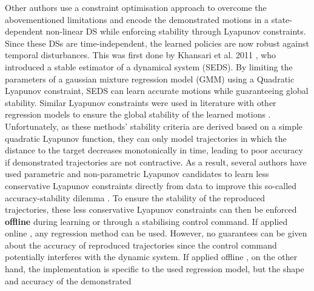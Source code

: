Other authors use a constraint optimisation approach to overcome the abovementioned limitations and encode the demonstrated motions in a state-dependent non-linear DS while enforcing stability through Lyapunov constraints. Since these DSs are time-independent, the learned policies are now robust against temporal disturbances. This was first done by Khansari et al. 2011 \cite{khansari-zadehLearningStableNonlinear2011}, who introduced a stable estimator of a dynamical system (SEDS). By limiting the parameters of a gaussian mixture regression model (GMM) using a Quadratic Lyapunov constraint, SEDS can learn accurate motions while guaranteeing global stability. Similar Lyapunov constraints were used in literature with other regression models to ensure the global stability of the learned motions \cite{lemmeNeurallyImprintedStable2013,huNeuralLearningStable2015,umlauftLearningStableStochastic2017,umlauftLearningStableGaussian2017,medinaLearningStableTask2017,duanFastStableLearning2019,xuRobotTrajectoryTracking2019,umlauftLearningStochasticallyStable2020,ledererGaussianProcessBasedRealTime2021,xuLearningBasedKinematicControl2022,salehiLearningDiscreteTimeUncertain2022,davoodiRuleBasedSafeProbabilistic2022}. Unfortunately, as these methods' stability criteria are derived based on a simple quadratic Lyapunov function, they can only model trajectories in which the distance to the target decreases monotonically in time, leading to poor accuracy if demonstrated trajectories are not contractive. As a result, several authors have used parametric and non-parametric Lyapunov candidates to learn less conservative Lyapunov constraints directly from data to improve this so-called accuracy-stability dilemma \cite{khansari-zadehLearningControlLyapunov2014,neumannNeuralLearningStable2013,lemmeNeuralLearningVector2014,umlauftLearningStableGaussian2017,umlauftUncertaintybasedControlLyapunov2018,duttaLearningStableMovement2018,umlauftUncertaintybasedHumanMotion2019,duttaSkillLearningHuman2021,ravanbakhshLearningControlLyapunov2019,ravanbakhshFormalPolicyLearning2019,umlauftLearningStochasticallyStable2020,xiaoLearningStableNonparametric2020,tesfazgiInverseReinforcementLearning2021,coulombeGeneratingStableCollisionFree2022}. To ensure the stability of the reproduced trajectories, these less conservative Lyapunov constraints can then be enforced \textbf{offline} during learning or  through a stabilising control command. If applied online \cite{khansari-zadehLearningControlLyapunov2014,umlauftLearningStableGaussian2017,umlauftUncertaintybasedControlLyapunov2018,duttaLearningStableMovement2018,umlauftUncertaintybasedHumanMotion2019,ravanbakhshFormalPolicyLearning2019,ravanbakhshLearningControlLyapunov2019,xiaoLearningStableNonparametric2020,duttaSkillLearningHuman2021,umlauftLearningStochasticallyStable2020}, any regression method can be used. However, no guarantees can be given about the accuracy of reproduced trajectories since the control command potentially interferes with the dynamic system. If applied offline \cite{neumannNeuralLearningStable2013,lemmeNeuralLearningVector2014,tesfazgiInverseReinforcementLearning2021,coulombeGeneratingStableCollisionFree2022}, on the other hand, the implementation is specific to the used regression model, but the shape and accuracy of the demonstrated 